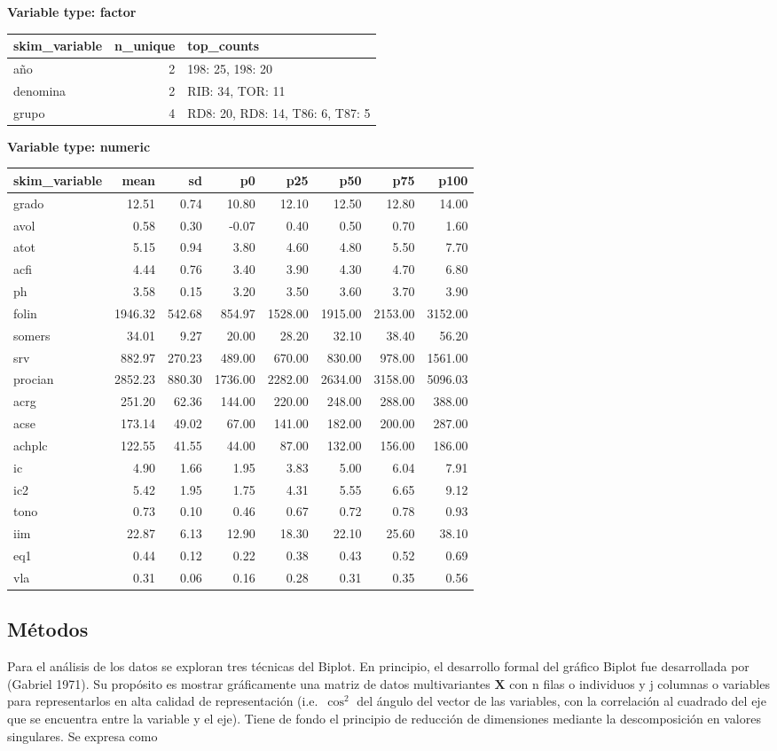 \documentclass[
  10pt,
  spanish,
]{article}
\begin{document}
\textbf{Variable type: factor}

\begin{longtable}[]{@{}lrl@{}}
\toprule
skim\_variable & n\_unique & top\_counts\tabularnewline
\midrule
\endhead
año & 2 & 198: 25, 198: 20\tabularnewline
denomina & 2 & RIB: 34, TOR: 11\tabularnewline
grupo & 4 & RD8: 20, RD8: 14, T86: 6, T87: 5\tabularnewline
\bottomrule
\end{longtable}

\textbf{Variable type: numeric}

\begin{longtable}[]{@{}lrrrrrrr@{}}
\toprule
skim\_variable & mean & sd & p0 & p25 & p50 & p75 & p100\tabularnewline
\midrule
\endhead
grado & 12.51 & 0.74 & 10.80 & 12.10 & 12.50 & 12.80 &
14.00\tabularnewline
avol & 0.58 & 0.30 & -0.07 & 0.40 & 0.50 & 0.70 & 1.60\tabularnewline
atot & 5.15 & 0.94 & 3.80 & 4.60 & 4.80 & 5.50 & 7.70\tabularnewline
acfi & 4.44 & 0.76 & 3.40 & 3.90 & 4.30 & 4.70 & 6.80\tabularnewline
ph & 3.58 & 0.15 & 3.20 & 3.50 & 3.60 & 3.70 & 3.90\tabularnewline
folin & 1946.32 & 542.68 & 854.97 & 1528.00 & 1915.00 & 2153.00 &
3152.00\tabularnewline
somers & 34.01 & 9.27 & 20.00 & 28.20 & 32.10 & 38.40 &
56.20\tabularnewline
srv & 882.97 & 270.23 & 489.00 & 670.00 & 830.00 & 978.00 &
1561.00\tabularnewline
procian & 2852.23 & 880.30 & 1736.00 & 2282.00 & 2634.00 & 3158.00 &
5096.03\tabularnewline
acrg & 251.20 & 62.36 & 144.00 & 220.00 & 248.00 & 288.00 &
388.00\tabularnewline
acse & 173.14 & 49.02 & 67.00 & 141.00 & 182.00 & 200.00 &
287.00\tabularnewline
achplc & 122.55 & 41.55 & 44.00 & 87.00 & 132.00 & 156.00 &
186.00\tabularnewline
ic & 4.90 & 1.66 & 1.95 & 3.83 & 5.00 & 6.04 & 7.91\tabularnewline
ic2 & 5.42 & 1.95 & 1.75 & 4.31 & 5.55 & 6.65 & 9.12\tabularnewline
tono & 0.73 & 0.10 & 0.46 & 0.67 & 0.72 & 0.78 & 0.93\tabularnewline
iim & 22.87 & 6.13 & 12.90 & 18.30 & 22.10 & 25.60 &
38.10\tabularnewline
eq1 & 0.44 & 0.12 & 0.22 & 0.38 & 0.43 & 0.52 & 0.69\tabularnewline
vla & 0.31 & 0.06 & 0.16 & 0.28 & 0.31 & 0.35 & 0.56\tabularnewline
\bottomrule
\end{longtable}

\addtocounter{table}{-2}

\hypertarget{muxe9todos}{%
\subsection{Métodos}\label{muxe9todos}}

Para el análisis de los datos se exploran tres técnicas del Biplot. En
principio, el desarrollo formal del gráfico Biplot fue desarrollada por
(Gabriel 1971). Su propósito es mostrar gráficamente una matriz de datos
multivariantes \(\mathbf{X}\) con \(\mathrm{n}\) filas o individuos y
\(\mathrm{j}\) columnas o variables para representarlos en alta calidad
de representación (i.e.~\(\cos^2\) del ángulo del vector de las
variables, con la correlación al cuadrado del eje que se encuentra entre
la variable y el eje). Tiene de fondo el principio de reducción de
dimensiones mediante la descomposición en valores singulares. Se expresa
como
\end{document}
